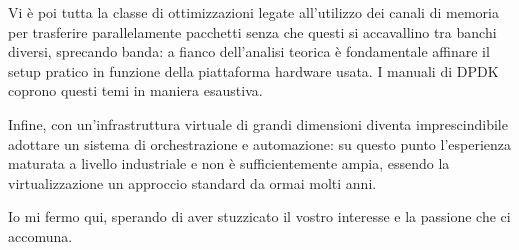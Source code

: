 Vi è poi tutta la classe di ottimizzazioni legate all'utilizzo dei canali di memoria per trasferire parallelamente pacchetti senza che questi si accavallino tra banchi diversi, sprecando banda: a fianco dell'analisi teorica è fondamentale affinare il setup pratico in funzione della piattaforma hardware usata. I manuali di DPDK coprono questi temi in maniera esaustiva.


Infine, con un'infrastruttura virtuale di grandi dimensioni diventa imprescindibile adottare un sistema di orchestrazione e automazione: su questo punto l'esperienza maturata a livello industriale e non è sufficientemente ampia, essendo la virtualizzazione un approccio standard da ormai molti anni.

Io mi fermo qui, sperando di aver stuzzicato il vostro interesse e la passione che ci accomuna.